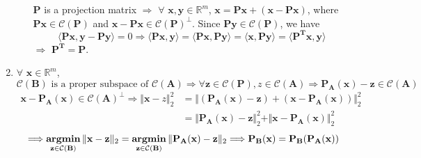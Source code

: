 \documentclass[11pt,letter,notitlepage]{article}
\DeclareMathOperator*{\argmin}{\bf argmin}
\newcommand{\proj}[2]{\textbf{P}_{#2} (#1)}
\begin{document}
\begin{solution}
\begin{enumerate}
\begin{enumerate}
		$\mathbf{P}$ is a projection matrix $\Longrightarrow$ $\forall$ $\mathbf{x}, \mathbf{y} \in \mathbb{R}^m$, $\mathbf{x} = \mathbf{Px} + (\mathbf{x-Px})$, where $\mathbf{Px} \in \mathcal{C}(\mathbf{P})$ and $\mathbf{x-Px} \in \mathcal{C}(\mathbf{P})^{\perp}$. Since $\mathbf{Py} \in \mathcal{C}(\mathbf{P})$, we have
		\[
		\langle \mathbf{Px}, \mathbf{y} - \mathbf{Py} \rangle
		=
		0
		\Longrightarrow
		\langle \mathbf{Px}, \mathbf{y} \rangle
		=
		\langle \mathbf{Px}, \mathbf{Py} \rangle
		=
		\langle \mathbf{x}, \mathbf{Py} \rangle
		=
		\langle \mathbf{P^T x}, \mathbf{y} \rangle
		\]
		$\Longrightarrow$ $\mathbf{P^T} = \mathbf{P}$.
	\end{enumerate}
	\item $\forall$ $\mathbf{x} \in \mathbb{R}^m$,
	\[
	\mathcal{C}(\mathbf{B}) \text{ is a proper subspace of } \mathcal{C}(\mathbf{A})
	\Longrightarrow
	\forall \mathbf{z}\in\mathcal{C}(\mathbf{P}), z\in\mathcal{C}(\mathbf{A})
	\Longrightarrow
	\proj{\mathbf{x}}{\mathbf{A}} - \mathbf{z} \in \mathcal{C}(\mathbf{A})
	\]
	\begin{align*}
	\mathbf{x} - \proj{\mathbf{x}}{\mathbf{A}} \in \mathcal{C}(\mathbf{A})^{\perp}
	\Longrightarrow
	\Vert \mathbf{x} - z \Vert_2^2
	&=
	\Vert (\proj{\mathbf{x}}{\mathbf{A}} - \mathbf{z}) + \left(\mathbf{x}-\proj{\mathbf{x}}{\mathbf{A}}\right) \Vert_2^2\\
	&=
	\Vert \proj{\mathbf{x}}{\mathbf{A}} - \mathbf{z} \Vert_2^2
	+
	\Vert \mathbf{x}-\proj{\mathbf{x}}{\mathbf{A}} \Vert_2^2
	\end{align*}
	\[
	\Longrightarrow
	\argmin_{\mathbf{z} \in \mathcal{C}(\mathbf{B})} \Vert \mathbf{x} - \mathbf{z} \Vert_2
	=
	\argmin_{\mathbf{z} \in \mathcal{C}(\mathbf{B})} \Vert \proj{\mathbf{x}}{\mathbf{A}} - \mathbf{z} \Vert_2
	\Longrightarrow
	\proj{\mathbf{x}}{\mathbf{B}}
	=
	\proj{\proj{\mathbf{x}}{\mathbf{A}}}{\mathbf{B}}
	\]
\end{enumerate}
\end{solution}
\end{document}
